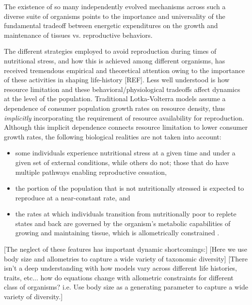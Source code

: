 \documentclass[12pt,english]{article}
\begin{document}
\begin{spacing}{1.9}
The existence of so many independently evolved mechanisms across such a diverse suite of organisms points to the importance and universality of the fundamental tradeoff between energetic expenditures on the growth and maintenance of tissues vs. reproductive behaviors.

The different strategies employed to avoid reproduction during times of nutritional stress, and how this is achieved among different organisms, has received tremendous empirical and theoretical attention owing to the importance of these activities in shaping life-history [REF].
Less well understood is how resource limitation and these behavioral/physiological tradeoffs affect dynamics at the level of the population.
Traditional Lotka-Volterra models assume a dependence of consumer population growth rates on resource density, thus \emph{implicitly} incorporating the requirement of resource availability for reproduction.
Although this implicit dependence connects resource limitation to lower consumer growth rates, the following biological realities are not taken into account: 
\begin{itemize}
\item some individuals experience nutritional stress at a given time and under a given set of external conditions, while others do not; those that do have multiple pathways enabling reproductive cessation, 
\item the portion of the population that is not nutritionally stressed is expected to reproduce at a near-constant rate, and
\item the rates at which individuals transition from nutritionally poor to replete states and back are governed by the organism's metabolic capabilities of growing and maintaining tissue, which is allometrically constrained \citep{Kempes:2012hy}.
\end{itemize}
[The neglect of these features has important dynamic shortcomings:]
[Here we use body size and allometries to capture a wide variety of taxonomic diversity]
[There isn't a deep understanding with how models vary across different life histories, traits, etc... how do equations change with allometric constraints for different class of organisms? 
i.e. Use body size as a generating parameter to capture a wide variety of diversity.]



\end{spacing}
\end{document}

